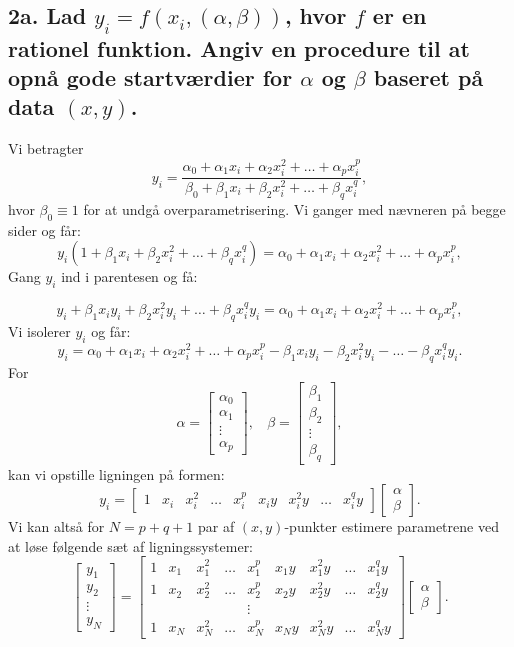 \documentclass[12pt]{report}
\theoremstyle{break}
\theoremstyle{break}
\begin{document}
\clearpage
 
\subsection*{2a. Lad $y_i=f(x_i,(\alpha,\beta))$, hvor $f$ er en rationel funktion. Angiv en procedure til at opnå gode startværdier for $\alpha$ og $\beta$ baseret på data $(x,y)$.}
Vi betragter
\[y_i = \frac{\alpha_0+\alpha_1 x_i+\alpha_2x_i^2 +\ldots+\alpha_p x_i^p}{\beta_0+\beta_1 x_i+\beta_2 x_i^2+\ldots+\beta_q x_i^q},\]
hvor $\beta_0 \equiv 1$ for at undgå overparametrisering.
Vi ganger med nævneren på begge sider og får:
\[y_i(1+\beta_1 x_i+\beta_2 x_i^2+\ldots+\beta_q x_i^q) = \alpha_0+\alpha_1 x_i+\alpha_2x_i^2 +\ldots+\alpha_p x_i^p,\]
 Gang $y_i$ ind i parentesen og få:
 
 \[y_i+\beta_1 x_iy_i+\beta_2 x_i^2y_i+\ldots+\beta_q x_i^qy_i = \alpha_0+\alpha_1 x_i+\alpha_2x_i^2 +\ldots+\alpha_p x_i^p,\]
 Vi isolerer $y_i$ og får:
 \[y_i = \alpha_0+\alpha_1 x_i+\alpha_2x_i^2 +\ldots+\alpha_p x_i^p-\beta_1 x_iy_i-\beta_2 x_i^2y_i-\ldots-\beta_q x_i^qy_i.\]
 For \[\alpha = \begin{bmatrix}\alpha_0\\\alpha_1\\\vdots\\\alpha_p\end{bmatrix},~~~~\beta = \begin{bmatrix}\beta_1\\\beta_2\\\vdots\\\beta_q\end{bmatrix},\]
 kan vi opstille ligningen på formen:
 \[y_i = \begin{bmatrix}1 & x_i & x_i^2 & \ldots & x_i^p & x_iy & x_i^2y & \ldots & x_i^qy \end{bmatrix}\begin{bmatrix}\alpha\\\beta\end{bmatrix}.\]
 Vi kan altså for $N=p+q+1$ par af $(x,y)$-punkter estimere parametrene ved at løse følgende sæt af ligningssystemer:
 \[\begin{bmatrix}y_1\\y_2\\\vdots\\y_{N}\end{bmatrix} = \begin{bmatrix}
 1 & x_1 & x_1^2 & \ldots & x_1^p & x_1y & x_1^2y & \ldots & x_1^qy \\
 1 & x_2 & x_2^2 & \ldots & x_2^p & x_2y & x_2^2y & \ldots & x_2^qy \\
  &  &  &  & \vdots & & & & \\
 1 & x_N & x_N^2 & \ldots & x_N^p & x_Ny & x_N^2y & \ldots & x_N^qy
 \end{bmatrix}\begin{bmatrix}\alpha\\\beta\end{bmatrix}.\]
\end{document}
